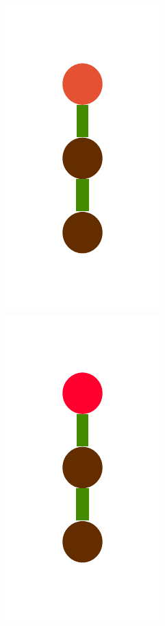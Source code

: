 \documentclass[a4paper,10pt]{article}
\begin{document}
\begin{figure}[t]
\centering
\includegraphics[scale=.26]{./figures/4-2-4-constructor-induction-pre-0.pdf}
\includegraphics[scale=.26]{./figures/4-2-4-constructor-induction-pre-1.pdf}

\end{figure}
\end{document}
